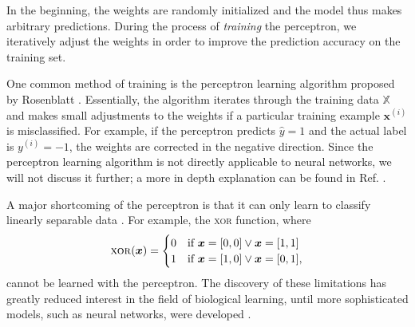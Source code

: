 In the beginning, the weights are randomly initialized and the model thus makes arbitrary predictions. During the process of \emph{training} the perceptron, we iteratively adjust the weights in order to improve the prediction accuracy on the training set.

One common method of training is the perceptron learning algorithm proposed by Rosenblatt \cite{Rosenblatt1958386}. Essentially, the algorithm iterates through the training data $\mathbb{X}$ and makes small adjustments to the weights if a particular training example $\bm{x}^{(i)}$ is misclassified. For example, if the perceptron predicts $\hat{y} = 1$ and the actual label is $y^{(i)} = -1$, the weights are corrected in the negative direction. Since the perceptron learning algorithm is not directly applicable to neural networks, we will not discuss it further; a more in depth explanation can be found in Ref. \cite[Ch.\,8,\,pp.\,265-267]{DBLP:books/lib/Murphy12}.

A major shortcoming of the perceptron is that it can only learn to classify linearly separable data \cite{DBLP:books/daglib/0066902}. For example, the \textsc{xor} function, where 
\begin{equation}
\text{\textsc{xor}}(\bm{x}) = 
\begin{cases} 0 & \text{if }\bm{x} = [0,0] \lor \bm{x} = [1,1] 
			\\1 & \text{if }\bm{x} = [1,0] \lor \bm{x} = [0,1],
\end{cases}
\end{equation}
cannot be learned with the perceptron. The discovery of these limitations has greatly reduced interest in the field of biological learning, until more sophisticated models, such as neural networks, were developed \cite[Ch.\,1,\,pp.\,12-18]{DBLP:books/daglib/0040158}.